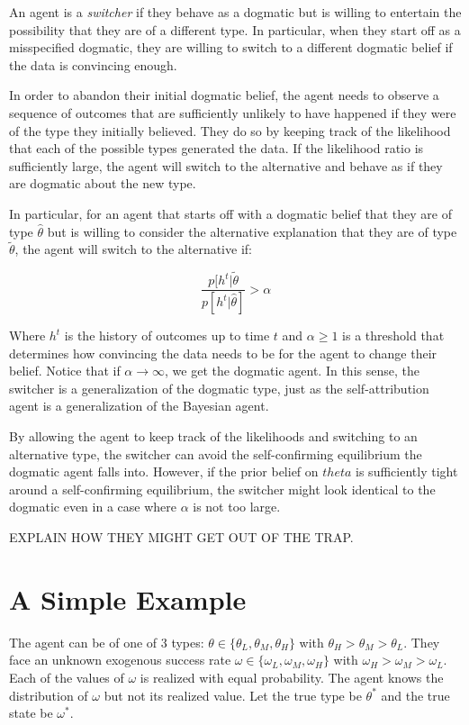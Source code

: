 \documentclass[
  12pt,
]{article}
\begin{document}
An agent is a \emph{switcher} if they behave as a dogmatic but is
willing to entertain the possibility that they are of a different type.
In particular, when they start off as a misspecified dogmatic, they are
willing to switch to a different dogmatic belief if the data is
convincing enough.

In order to abandon their initial dogmatic belief, the agent needs to
observe a sequence of outcomes that are sufficiently unlikely to have
happened if they were of the type they initially believed. They do so by
keeping track of the likelihood that each of the possible types
generated the data. If the likelihood ratio is sufficiently large, the
agent will switch to the alternative and behave as if they are dogmatic
about the new type.

In particular, for an agent that starts off with a dogmatic belief that
they are of type \(\hat{\theta}\) but is willing to consider the
alternative explanation that they are of type \(\tilde{\theta}\), the
agent will switch to the alternative if:

\[\frac{p[h^t|\tilde{\theta}}{p[h^t|\hat{\theta}]} > \alpha\]

Where \(h^t\) is the history of outcomes up to time \(t\) and
\(\alpha \geq 1\) is a threshold that determines how convincing the data
needs to be for the agent to change their belief. Notice that if
\(\alpha \to \infty\), we get the dogmatic agent. In this sense, the
switcher is a generalization of the dogmatic type, just as the
self-attribution agent is a generalization of the Bayesian agent.

By allowing the agent to keep track of the likelihoods and switching to
an alternative type, the switcher can avoid the self-confirming
equilibrium the dogmatic agent falls into. However, if the prior belief
on \(theta\) is sufficiently tight around a self-confirming equilibrium,
the switcher might look identical to the dogmatic even in a case where
\(\alpha\) is not too large.

EXPLAIN HOW THEY MIGHT GET OUT OF THE TRAP.

\hypertarget{a-simple-example}{%
\section{A Simple Example}\label{a-simple-example}}

The agent can be of one of 3 types:
\(\theta \in \{\theta_L, \theta_M, \theta_H\}\) with
\(\theta_H > \theta_M > \theta_L\). They face an unknown exogenous
success rate \(\omega \in \{\omega_L, \omega_M, \omega_H\}\) with
\(\omega_H>\omega_M>\omega_L\). Each of the values of \(\omega\) is
realized with equal probability. The agent knows the distribution of
\(\omega\) but not its realized value. Let the true type be \(\theta^*\)
and the true state be \(\omega^*\).
\end{document}
